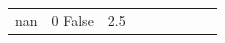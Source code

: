 \begin{table}[H]
\begin{tabular}{lllrlllll}
nan & 0%
\cline{1-9}
False & 2.5%

\end{tabular}
\end{table}
